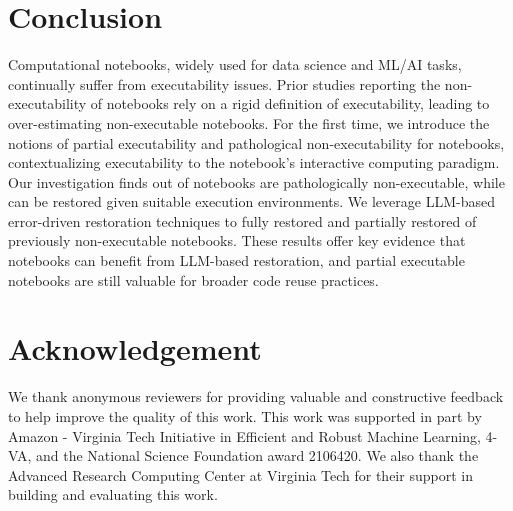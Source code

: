 

\section{Conclusion}
\label{sec:conclusion}

Computational notebooks, widely used for data science and ML/AI tasks, continually suffer from executability issues. Prior studies reporting the non-executability of notebooks rely on a rigid definition of executability, leading to over-estimating non-executable notebooks. For the first time, we introduce the notions of partial executability and pathological non-executability for notebooks, contextualizing executability to the notebook's interactive computing paradigm. Our investigation finds \totalPathological out of \totalNotebooksInDataset notebooks are pathologically non-executable, while \totalRestorable can be restored given suitable execution environments. We leverage LLM-based error-driven restoration techniques to fully restored \percentFullyRestored and partially restored \percentPartiallyRestored of previously non-executable notebooks. These results offer key evidence that notebooks can benefit from LLM-based restoration, and partial executable notebooks are still valuable for broader code reuse practices. 


\section*{Acknowledgement} We thank anonymous reviewers for providing valuable and constructive feedback to help improve the quality of this work. This work was supported in part by Amazon - Virginia Tech Initiative in Efficient and Robust Machine Learning, 4-VA, and the National Science Foundation award 2106420. We also thank the Advanced Research Computing Center at Virginia Tech for their support in building and evaluating this work.


